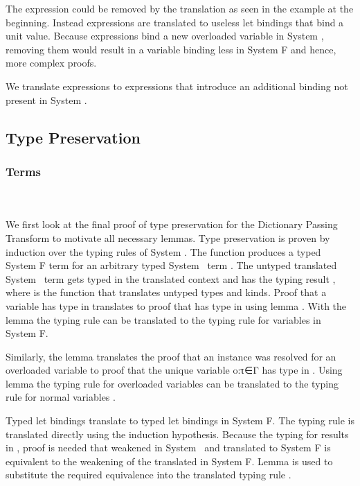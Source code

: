 \noindent The  expression could be removed by the translation as seen in the example at the beginning. 
Instead  expressions are translated to useless let bindings that bind a unit value.
Because  expressions bind a new overloaded variable in System \Fo, removing them would result in a variable binding less in System F and hence, more complex proofs. 

\noindent We translate  expressions to  expressions that introduce an additional binding not present in System \Fo.

\subsection{Type Preservation}
\subsubsection{Terms}\hfill\\\\
We first look at the final proof of type preservation for the Dictionary Passing Transform to motivate all necessary lemmas. 
Type preservation is proven by induction over the typing rules of System \Fo. 
The function  produces a typed System F term for an arbitrary typed System \Fo\ term . 
The untyped translated System \Fo\ term   gets typed in the translated context   and has the typing result  , where  is the function that translates untyped types and kinds.
\DPTTermPres
Proof  that a variable  has type  in  translates to proof that   has type   in   using lemma . 
With the lemma  the typing rule  can be translated to the typing rule for variables in System F. 

\noindent Similarly, the lemma  translates the proof that an instance  \Constr{:}  was resolved for an overloaded variable  to proof that the unique variable  {o:τ∈Γ} has type   in  .  
Using lemma  the typing rule for overloaded variables  can be translated to the typing rule for normal variables .

\noindent Typed let bindings    translate to typed let bindings in System F. 
The typing rule  is translated directly using the induction hypothesis. 
Because the typing for  results in  , proof is needed that  weakened in System \Fo\ and translated to System F is equivalent to the weakening of the translated  in System F. 
Lemma  is used to substitute the required equivalence into the translated typing rule  .

